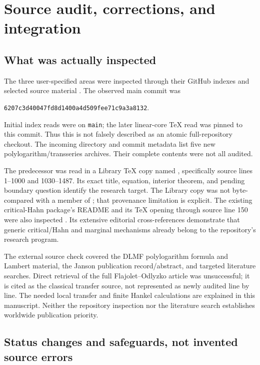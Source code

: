 \documentclass[11pt,a4paper]{article}
\theoremstyle{definition}\newtheorem{definition}[theorem]{Definition}
\theoremstyle{remark}\newtheorem{remark}[theorem]{Remark}
\numberwithin{equation}{section}
\begin{document}
\section{Source audit, corrections, and integration}\label{qb:sec:audit}

\subsection{What was actually inspected}

The three user-specified areas were inspected through their GitHub
indexes and selected source material \cite{repopoly,repotrans,repoincoming}. The observed main commit was
\begin{center}\small
\texttt{6207c3d40047fd8d1400a4d509fee71c9a3a8132}.
\end{center}
Initial index reads were on \texttt{main}; the later linear-core TeX read
was pinned to this commit. Thus this is not falsely described as an atomic
full-repository checkout. The incoming directory and commit metadata list
five new polylogarithm/transseries archives. Their complete contents were
not all audited.

The predecessor \cite{prior} was read in a Library TeX copy named
, specifically source lines 1--1000
and 1030--1487. Its exact title, equation, interior theorem, and pending
boundary question identify the research target. The Library copy was not
byte-compared with a member of
; that
provenance limitation is explicit. The existing critical-Hahn package's
README and its TeX opening through source line 150 were also inspected
\cite{repocritical}. Its extensive editorial cross-references demonstrate
that generic critical/Hahn and marginal mechanisms already belong to the
repository's research program.

The external source check covered the DLMF polylogarithm formula and
Lambert material, the Janson publication record/abstract, and targeted
literature searches. Direct retrieval of the full Flajolet--Odlyzko
article was unsuccessful; it is cited as the classical transfer source,
not represented as newly audited line by line. The needed local transfer
and finite Hankel calculations are explained in this manuscript. Neither
the repository inspection nor the literature search establishes worldwide
publication priority.

\subsection{Status changes and safeguards, not invented source errors}
\end{document}
